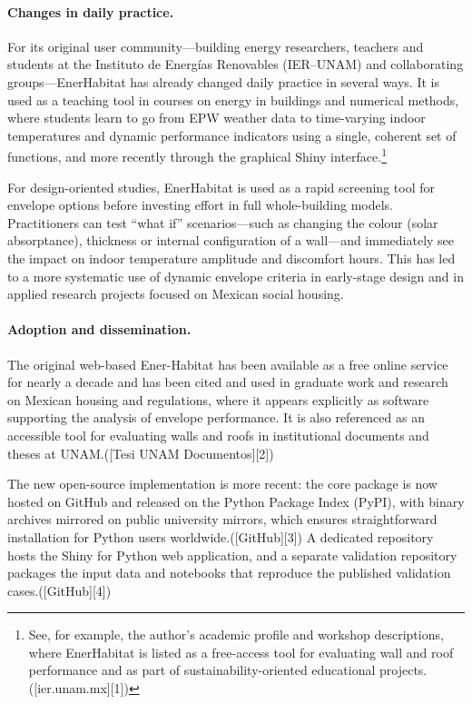 \documentclass[preprint,12pt, a4paper]{elsarticle}
\begin{document}
\paragraph{Changes in daily practice.}

For its original user community—building energy researchers, teachers and students at the Instituto de Energías Renovables (IER–UNAM) and collaborating groups—EnerHabitat has already changed daily practice in several ways. It is used as a teaching tool in courses on energy in buildings and numerical methods, where students learn to go from EPW weather data to time-varying indoor temperatures and dynamic performance indicators using a single, coherent set of functions, and more recently through the graphical Shiny interface.\footnote{See, for example, the author’s academic profile and workshop descriptions, where EnerHabitat is listed as a free-access tool for evaluating wall and roof performance and as part of sustainability-oriented educational projects.([ier.unam.mx][1])}

For design-oriented studies, EnerHabitat is used as a rapid screening tool for envelope options before investing effort in full whole-building models. Practitioners can test “what if” scenarios—such as changing the colour (solar absorptance), thickness or internal configuration of a wall—and immediately see the impact on indoor temperature amplitude and discomfort hours. This has led to a more systematic use of dynamic envelope criteria in early-stage design and in applied research projects focused on Mexican social housing.

\paragraph{Adoption and dissemination.}

The original web-based Ener-Habitat has been available as a free online service for nearly a decade and has been cited and used in graduate work and research on Mexican housing and regulations, where it appears explicitly as software supporting the analysis of envelope performance.\citep{barrios2016enerhabitat} It is also referenced as an accessible tool for evaluating walls and roofs in institutional documents and theses at UNAM.([Tesi UNAM Documentos][2])

The new open-source implementation is more recent: the core package is now hosted on GitHub and released on the Python Package Index (PyPI), with binary archives mirrored on public university mirrors, which ensures straightforward installation for Python users worldwide.([GitHub][3]) A dedicated repository hosts the Shiny for Python web application, and a separate validation repository packages the input data and notebooks that reproduce the published validation cases.([GitHub][4])
\end{document}
